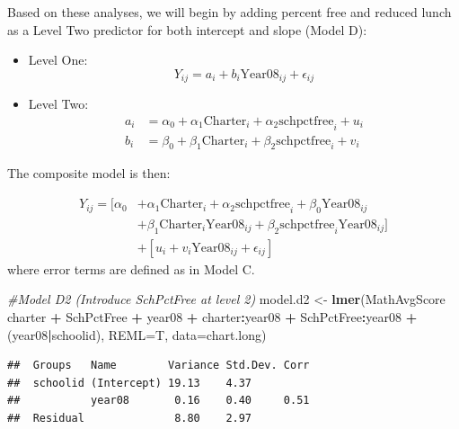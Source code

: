 \documentclass[
]{krantz}
\newenvironment{Shaded}{\begin{snugshade}}{\end{snugshade}}
\newcommand{\CommentTok}[1]{\textcolor[rgb]{0.37,0.37,0.37}{\textit{#1}}}
\newcommand{\DataTypeTok}[1]{\textcolor[rgb]{0.27,0.27,0.27}{#1}}
\newcommand{\KeywordTok}[1]{\textcolor[rgb]{0.27,0.27,0.27}{\textbf{#1}}}
\newcommand{\NormalTok}[1]{#1}
\newcommand{\OperatorTok}[1]{\textcolor[rgb]{0.43,0.43,0.43}{\textbf{#1}}}
\newcommand{\StringTok}[1]{\textcolor[rgb]{0.5,0.5,0.5}{#1}}
\begin{document}
Based on these analyses, we will begin by adding percent free and reduced lunch as a Level Two predictor for both intercept and slope (Model D):

\begin{itemize}
\item
  Level One:
  \begin{equation*}
  Y_{ij}=a_{i} + b_{i}\textrm{Year08}_{ij} + \epsilon_{ij}
  \end{equation*}
\item
  Level Two:
  \begin{align*}
  a_{i} & = \alpha_{0} + \alpha_{1}\textrm{Charter}_i + \alpha_{2}\textrm{schpctfree}_i + u_{i}\\
  b_{i} & = \beta_{0} + \beta_{1}\textrm{Charter}_i + \beta_{2}\textrm{schpctfree}_i + v_{i}
  \end{align*}
\end{itemize}

The composite model is then:

\begin{align*}
Y_{ij}= [\alpha_{0}&+\alpha_{1}\textrm{Charter}_i +\alpha_{2}\textrm{schpctfree}_i + \beta_{0}\textrm{Year08}_{ij} \nonumber \\
 &+ \beta_{1}\textrm{Charter}_i\textrm{Year08}_{ij}  + \beta_{2}\textrm{schpctfree}_i\textrm{Year08}_{ij}] \nonumber \\ 
 &+ [u_{i} + v_{i}\textrm{Year08}_{ij} + \epsilon_{ij}]
\end{align*}
where error terms are defined as in Model C.

\begin{Shaded}
\begin{Highlighting}[]
\CommentTok{#Model D2 (Introduce SchPctFree at level 2)}
\NormalTok{model.d2 <-}\StringTok{ }\KeywordTok{lmer}\NormalTok{(MathAvgScore}\OperatorTok{~}\StringTok{ }\NormalTok{charter }\OperatorTok{+}\StringTok{ }\NormalTok{SchPctFree }\OperatorTok{+}\StringTok{ }\NormalTok{year08 }\OperatorTok{+}\StringTok{ }
\StringTok{  }\NormalTok{charter}\OperatorTok{:}\NormalTok{year08 }\OperatorTok{+}\StringTok{ }\NormalTok{SchPctFree}\OperatorTok{:}\NormalTok{year08 }\OperatorTok{+}\StringTok{ }\NormalTok{(year08}\OperatorTok{|}\NormalTok{schoolid),}
  \DataTypeTok{REML=}\NormalTok{T, }\DataTypeTok{data=}\NormalTok{chart.long)}
\end{Highlighting}
\end{Shaded}

\begin{verbatim}
##  Groups   Name        Variance Std.Dev. Corr
##  schoolid (Intercept) 19.13    4.37         
##           year08       0.16    0.40     0.51
##  Residual              8.80    2.97
\end{verbatim}
\end{document}
